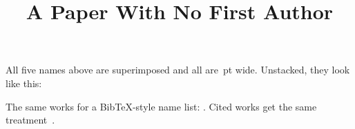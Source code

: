 \documentclass{article}
\title{A Paper With No First Author}
\author{\equalauthorsAuthors}
\date{}
\begin{document}
  \maketitle

  All five names above are superimposed and all are
  \equalauthorsWidth\,pt wide. Unstacked, they look like this:

  \begin{center}
    \equalauthorsAuthorsStacked
  \end{center}

  The same works for a BibTeX-style name list:
  .
  Cited works get the same treatment~\cite{demaine2023every}.

  \printbibliography
\end{document}
